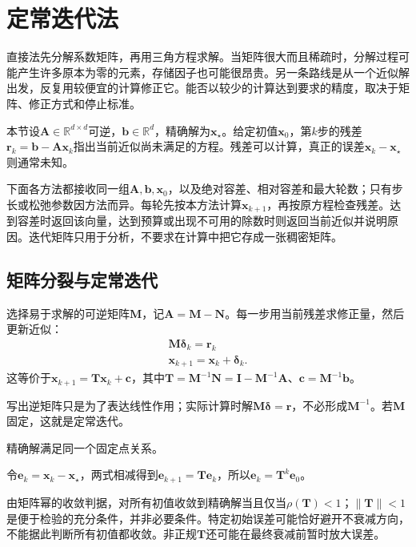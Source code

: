 \section{定常迭代法}
\label{sec:ls-stationary-iterations}

直接法先分解系数矩阵，再用三角方程求解。当矩阵很大而且稀疏时，分解过程可能产生许多原本为零的元素，存储因子也可能很昂贵。另一条路线是从一个近似解出发，反复用较便宜的计算修正它。能否以较少的计算达到要求的精度，取决于矩阵、修正方式和停止标准。

本节设$\bm A\in\mathbb R^{d\times d}$可逆，$\bm b\in\mathbb R^d$，精确解为$\bm x_\star$。给定初值$\bm x_{0}$，第$k$步的残差$\bm r_{k}=\bm b-\bm A\bm x_{k}$指出当前近似尚未满足的方程。残差可以计算，真正的误差$\bm x_{k}-\bm x_\star$则通常未知。

下面各方法都接收同一组$\bm A,\bm b,\bm x_0$，以及绝对容差、相对容差和最大轮数；只有步长或松弛参数因方法而异。每轮先按本方法计算$\bm x_{k+1}$，再按原方程检查残差。达到容差时返回该向量，达到预算或出现不可用的除数时则返回当前近似并说明原因。迭代矩阵只用于分析，不要求在计算中把它存成一张稠密矩阵。

\subsection{矩阵分裂与定常迭代}

选择易于求解的可逆矩阵$\bm M$，记$\bm A=\bm M-\bm N$。每一步用当前残差求修正量，然后更新近似：
\begin{equation}
\begin{gathered}
\bm M\bm\delta_k=\bm r_{k}\\
\bm x_{k+1}=\bm x_{k}+\bm\delta_k.
\end{gathered}
\label{eq:ls-stationary-correction}
\end{equation}
这等价于$\bm x_{k+1}=\bm T\bm x_{k}+\bm c$，其中$\bm T=\bm M^{-1}\bm N=\bm I-\bm M^{-1}\bm A$、$\bm c=\bm M^{-1}\bm b$。

写出逆矩阵只是为了表达线性作用；实际计算时解$\bm M\bm\delta=\bm r$，不必形成$\bm M^{-1}$。若$\bm M$固定，这就是定常迭代。

精确解满足同一个固定点关系。

令$\bm e_{k}=\bm x_{k}-\bm x_\star$，两式相减得到$\bm e_{k+1}=\bm T\bm e_{k}$，所以$\bm e_{k}=\bm T^k\bm e_{0}$。

由矩阵幂的收敛判据，对所有初值收敛到精确解当且仅当$\rho(\bm T)<1$；$\lVert\bm T\rVert<1$是便于检验的充分条件，并非必要条件。特定初始误差可能恰好避开不衰减方向，不能据此判断所有初值都收敛。非正规$\bm T$还可能在最终衰减前暂时放大误差。

